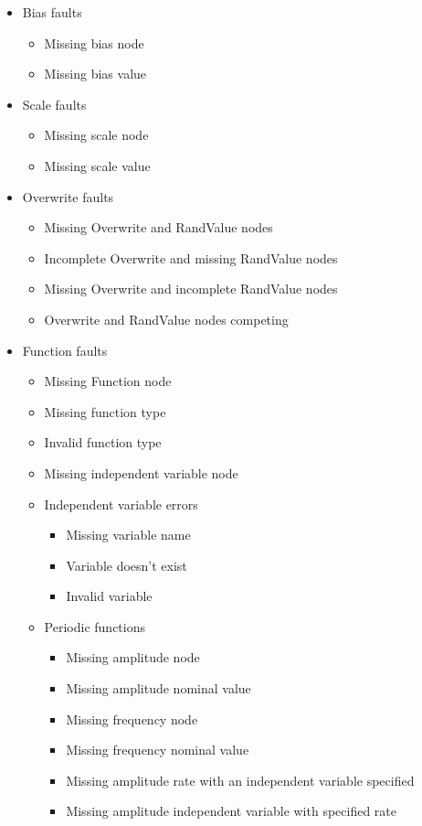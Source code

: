 \documentclass[11pt,fleqn]{report}
\begin{document}
\begin{itemize}
\begin{itemize}
  \item Bias faults
    \begin{itemize}
    \item Missing bias node
    \item Missing bias value
    \end{itemize}
  \item Scale faults
    \begin{itemize}
    \item Missing scale node
    \item Missing scale value
    \end{itemize}
  \item Overwrite faults
    \begin{itemize}
    \item Missing Overwrite and RandValue nodes
    \item Incomplete Overwrite and missing RandValue nodes
    \item Missing Overwrite and incomplete RandValue nodes
    \item Overwrite and RandValue nodes competing
    \end{itemize}
  \item Function faults
    \begin{itemize}
    \item Missing Function node
    \item Missing function type
    \item Invalid function type
    \item Missing independent variable node
    \item Independent variable errors
      \begin{itemize}
      \item Missing variable name
      \item Variable doesn't exist
      \item Invalid variable
      \end{itemize}
    \item Periodic functions
      \begin{itemize}
      \item Missing amplitude node
      \item Missing amplitude nominal value
      \item Missing frequency node
      \item Missing frequency nominal value
      \item Missing amplitude rate with an independent variable specified
      \item Missing amplitude independent variable with specified rate

\end{itemize}
\end{itemize}
\end{itemize}
\end{itemize}
\end{document}
